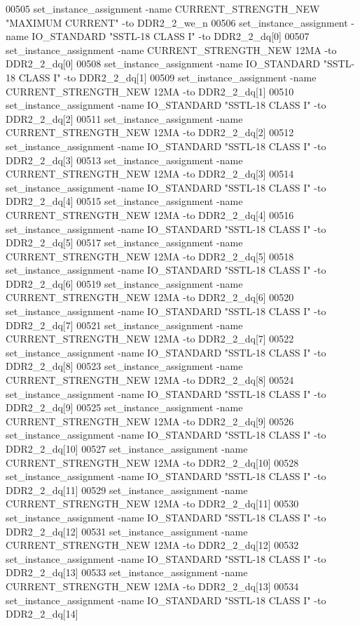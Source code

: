 \begin{DoxyCode}
00505 set\_instance\_assignment -name CURRENT\_STRENGTH\_NEW "MAXIMUM CURRENT" -to DDR2\_2\_we\_n
00506 set\_instance\_assignment -name IO\_STANDARD "SSTL-18 CLASS I" -to DDR2\_2\_dq[0]
00507 set\_instance\_assignment -name CURRENT\_STRENGTH\_NEW 12MA -to DDR2\_2\_dq[0]
00508 set\_instance\_assignment -name IO\_STANDARD "SSTL-18 CLASS I" -to DDR2\_2\_dq[1]
00509 set\_instance\_assignment -name CURRENT\_STRENGTH\_NEW 12MA -to DDR2\_2\_dq[1]
00510 set\_instance\_assignment -name IO\_STANDARD "SSTL-18 CLASS I" -to DDR2\_2\_dq[2]
00511 set\_instance\_assignment -name CURRENT\_STRENGTH\_NEW 12MA -to DDR2\_2\_dq[2]
00512 set\_instance\_assignment -name IO\_STANDARD "SSTL-18 CLASS I" -to DDR2\_2\_dq[3]
00513 set\_instance\_assignment -name CURRENT\_STRENGTH\_NEW 12MA -to DDR2\_2\_dq[3]
00514 set\_instance\_assignment -name IO\_STANDARD "SSTL-18 CLASS I" -to DDR2\_2\_dq[4]
00515 set\_instance\_assignment -name CURRENT\_STRENGTH\_NEW 12MA -to DDR2\_2\_dq[4]
00516 set\_instance\_assignment -name IO\_STANDARD "SSTL-18 CLASS I" -to DDR2\_2\_dq[5]
00517 set\_instance\_assignment -name CURRENT\_STRENGTH\_NEW 12MA -to DDR2\_2\_dq[5]
00518 set\_instance\_assignment -name IO\_STANDARD "SSTL-18 CLASS I" -to DDR2\_2\_dq[6]
00519 set\_instance\_assignment -name CURRENT\_STRENGTH\_NEW 12MA -to DDR2\_2\_dq[6]
00520 set\_instance\_assignment -name IO\_STANDARD "SSTL-18 CLASS I" -to DDR2\_2\_dq[7]
00521 set\_instance\_assignment -name CURRENT\_STRENGTH\_NEW 12MA -to DDR2\_2\_dq[7]
00522 set\_instance\_assignment -name IO\_STANDARD "SSTL-18 CLASS I" -to DDR2\_2\_dq[8]
00523 set\_instance\_assignment -name CURRENT\_STRENGTH\_NEW 12MA -to DDR2\_2\_dq[8]
00524 set\_instance\_assignment -name IO\_STANDARD "SSTL-18 CLASS I" -to DDR2\_2\_dq[9]
00525 set\_instance\_assignment -name CURRENT\_STRENGTH\_NEW 12MA -to DDR2\_2\_dq[9]
00526 set\_instance\_assignment -name IO\_STANDARD "SSTL-18 CLASS I" -to DDR2\_2\_dq[10]
00527 set\_instance\_assignment -name CURRENT\_STRENGTH\_NEW 12MA -to DDR2\_2\_dq[10]
00528 set\_instance\_assignment -name IO\_STANDARD "SSTL-18 CLASS I" -to DDR2\_2\_dq[11]
00529 set\_instance\_assignment -name CURRENT\_STRENGTH\_NEW 12MA -to DDR2\_2\_dq[11]
00530 set\_instance\_assignment -name IO\_STANDARD "SSTL-18 CLASS I" -to DDR2\_2\_dq[12]
00531 set\_instance\_assignment -name CURRENT\_STRENGTH\_NEW 12MA -to DDR2\_2\_dq[12]
00532 set\_instance\_assignment -name IO\_STANDARD "SSTL-18 CLASS I" -to DDR2\_2\_dq[13]
00533 set\_instance\_assignment -name CURRENT\_STRENGTH\_NEW 12MA -to DDR2\_2\_dq[13]
00534 set\_instance\_assignment -name IO\_STANDARD "SSTL-18 CLASS I" -to DDR2\_2\_dq[14]

\end{DoxyCode}
